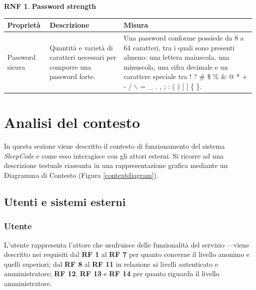 \documentclass[11pt, a4paper]{article}
\theoremstyle{definition} %
\newtheorem{nonfuncreq}{RNF} %
\begin{document}
\begin{nonfuncreq}
    \textbf{Password strength }
    \begin{center}
        \footnotesize
        \begin{tabularx}{\textwidth}{|X||X||X|}
            \hline
            \cellcolor{red!70}Proprietà & \cellcolor{red!70}Descrizione & \cellcolor{red!70}Misura\\
            \hline
            Password sicura & Quantità e varietà di caratteri necessari per comporre una password forte. & Una password conforme possiede da 8 a 64 caratteri, tra i quali sono presenti almeno: una lettera maiuscola, una minuscola, una cifra decimale e un carattere speciale tra ! ? \# \$ \% \& @ * + - / $\backslash$ = \_ . , ; : ( ) [ ] \{ \}.\\
            \hline
        \end{tabularx}
    \end{center}
\end{nonfuncreq}





\newpage
\section{Analisi del contesto}
In questa sezione viene descritto il contesto di funzionamento del sistema
\textit{SleepCode} e come esso interagisce con gli attori esterni. Si
ricorre ad una descrizione testuale riassunta in una rappresentazione
grafica mediante un Diagramma di Contesto (Figura \ref{contextdiagram}).

\subsection{Utenti e sistemi esterni} %
\subsubsection{Utente}
L'utente rappresenta l'attore che usufruisce delle funzionalità del servizio
—viene descritto nei requisiti dal \textbf{RF 1} al \textbf{RF 7} per quanto
concerne il livello anonimo e quelli superiori; dal \textbf{RF 8} al
\textbf{RF 11} in relazione ai livelli autenticato e amministratore; \textbf{RF 12},
\textbf{RF 13} e \textbf{RF 14} per quanto riguarda il livello amministratore.
\end{document}

